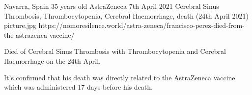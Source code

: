 {Navarra, Spain}
{35 years old}
{AstraZeneca}
{7th April 2021}
{Cerebral Sinus Thrombosis, Thrombocytopenia, Cerebral Haemorrhage, death (24th April 2021)}
{picture.jpg}
{https://nomoresilence.world/astra-zeneca/francisco-perez-died-from-the-astrazenca-vaccine/}
{

Died of Cerebral Sinus Thrombosis with Thrombocytopenia and Cerebral Haemorrhage
on the 24th April.

It’s confirmed that his death was directly related to the AstraZeneca vaccine
which was administered 17 days before his death.

}
